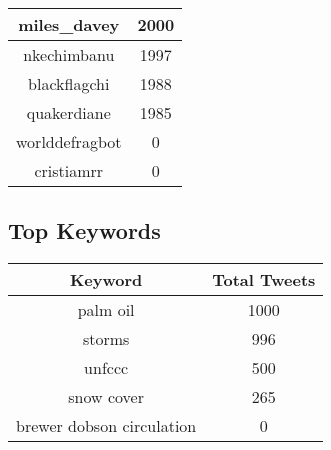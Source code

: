 \documentclass{article}\usepackage[T1]{fontenc}
\begin{document}
\begin{tabular}{|c|c|}
miles\_davey & 2000\\ 
 \hline
nkechimbanu & 1997\\ 
 \hline
blackflagchi & 1988\\ 
 \hline
quakerdiane & 1985\\ 
 \hline
worlddefragbot & 0\\ 
 \hline
cristiamrr & 0\\ 
 \hline
\end{tabular}\subsection*{Top Keywords}\begin{tabular}{|c|c|}         \hline         Keyword & Total Tweets \\ 
 \hline
palm oil & 1000\\ 
 \hline
storms & 996\\ 
 \hline
unfccc & 500\\ 
 \hline
snow cover & 265\\ 
 \hline
brewer dobson circulation & 0\\ 
 \hline
\end{tabular}
\end{document}
